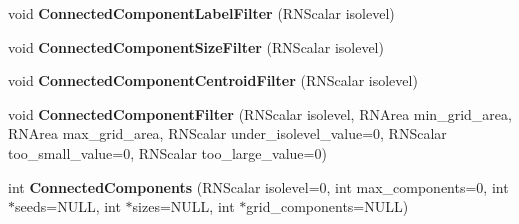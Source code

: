 \begin{DoxyCompactItemize}
\item 
void {\bfseries Connected\+Component\+Label\+Filter} (R\+N\+Scalar isolevel)\hypertarget{class_r3_planar_grid_ac5ff2b0bbe8cf3c2c8de9158a78bd053}{}\label{class_r3_planar_grid_ac5ff2b0bbe8cf3c2c8de9158a78bd053}

\item 
void {\bfseries Connected\+Component\+Size\+Filter} (R\+N\+Scalar isolevel)\hypertarget{class_r3_planar_grid_a7088680684ec4ed650fcadef89f78ad1}{}\label{class_r3_planar_grid_a7088680684ec4ed650fcadef89f78ad1}

\item 
void {\bfseries Connected\+Component\+Centroid\+Filter} (R\+N\+Scalar isolevel)\hypertarget{class_r3_planar_grid_a7c45805c77150594a8f5fa404278eef8}{}\label{class_r3_planar_grid_a7c45805c77150594a8f5fa404278eef8}

\item 
void {\bfseries Connected\+Component\+Filter} (R\+N\+Scalar isolevel, R\+N\+Area min\+\_\+grid\+\_\+area, R\+N\+Area max\+\_\+grid\+\_\+area, R\+N\+Scalar under\+\_\+isolevel\+\_\+value=0, R\+N\+Scalar too\+\_\+small\+\_\+value=0, R\+N\+Scalar too\+\_\+large\+\_\+value=0)\hypertarget{class_r3_planar_grid_a62958c436997256977c3c4b7eea86fbc}{}\label{class_r3_planar_grid_a62958c436997256977c3c4b7eea86fbc}

\item 
int {\bfseries Connected\+Components} (R\+N\+Scalar isolevel=0, int max\+\_\+components=0, int $\ast$seeds=N\+U\+LL, int $\ast$sizes=N\+U\+LL, int $\ast$grid\+\_\+components=N\+U\+LL)\hypertarget{class_r3_planar_grid_a5b916d4ea4232a75309f301b0e057bce}{}\label{class_r3_planar_grid_a5b916d4ea4232a75309f301b0e057bce}

\end{DoxyCompactItemize}
